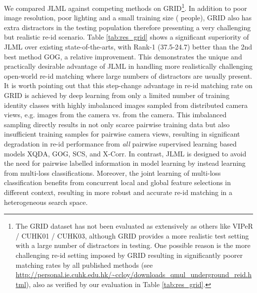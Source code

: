 \documentclass{article}
\begin{document}
\vspace{0.1cm}
We compared JLML against  competing methods on GRID\footnote{The
GRID dataset has not been evaluated as extensively as others like
VIPeR / CUHK01 / CUHK03, although GRID provides a more realistic test
setting with
a large number of distractors in testing. 
One possible reason is the more challenging re-id setting imposed by GRID resulting in significantly poorer matching rates by all published methods
(see \url{http://personal.ie.cuhk.edu.hk/~ccloy/downloads_qmul_underground_reid.html}), 
also as verified by our evaluation in Table \ref{tab:res_grid}.
}.
In addition to poor image resolution, poor lighting and 
a small training size ( people),
GRID also has extra distractors in the testing population therefore
presenting a very challenging but realistic re-id scenario.
Table \ref{tab:res_grid} shows a significant superiority of JLML 
over existing state-of-the-arts, with Rank-1 (37.5-24.7)
better than the 2nd best method GOG, a  relative improvement.
This demonstrates the unique and practically desirable advantage of JLML in handling
more realistically challenging open-world re-id matching where
large numbers of distractors are usually present.
It is worth pointing out that this step-change advantage in re-id matching rate on GRID
is achieved by deep learning from only a limited number of training
identity classes with highly imbalanced images sampled from  distributed camera views,
e.g.  images from the  camera vs. 
 from the  camera.
This imbalanced sampling directly results in 
not only scarce pairwise training data but also
insufficient training samples for pairwise camera views, resulting in
significant degradation in re-id performance from {\em all} pairwise
supervised learning based models XQDA, GOG, SCS, and X-Corr. 
In contrast, JLML is designed to avoid the need for pairwise labelled
information in model learning by instead learning from multi-loss classifications.
Moreover, the joint learning of multi-loss classification benefits
from concurrent local and global feature selections in different
context, resulting in more robust and accurate re-id matching in a
heterogeneous search space.
\end{document}
